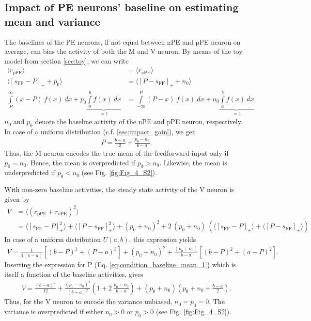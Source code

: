 \documentclass[10pt,a4paper,draft]{article}
\begin{document}
\subsection{Impact of PE neurons' baseline on estimating mean and variance}\label{sec:impact_baseline} 
%
The baselines of the PE neurons, if not equal between nPE and pPE neuron on average, can bias the activity of both the M and V neuron. By means of the toy model from section \ref{sec:toy}, we can write
%
\begin{align}
\label{eq:condition_baseline_mean}
\langle r_\mathrm{pPE} \rangle &= \langle r_\mathrm{nPE} \rangle \\
\langle \left[s_\mathrm{FF} - P\right]_+ + p_0\rangle &= \langle \left[P - s_\mathrm{FF}\right]_+ + n_0\rangle \nonumber\\
\int\limits_P^\infty (x - P)\ f(x)\ dx + p_0 \underbrace{\int\limits_a^b f(x)\ dx}_{=1}  &= \int\limits_{-\infty}^P (P - x)\ f(x)\ dx + n_0 \underbrace{\int\limits_a^b f(x)\ dx}_{=1} . \nonumber
\end{align}
%
$n_0$ and $p_0$ denote the baseline activity of the nPE and pPE neuron, respectively.
In case of a uniform distribution (c.f. \ref{sec:impact_gain}), we get 
%
%
\begin{align}
\label{eq:condition_baseline_mean_1}
P = \frac{b+a}{2} + \frac{p_0 - n_0}{b-a}.
\end{align}
%
Thus, the M neuron encodes the true mean of the feedforward input only if $p_0 = n_0$. Hence, the mean is overpredicted if $p_0 > n_0$. Likewise, the mean is underpredicted if $p_0 < n_0$ (see Fig. \ref{fig:Fig_4_S2}).

With non-zero baseline activities, the steady state activity of the V neuron is given by
%
\begin{align}
\label{eq:condition_baseline_variance}
V &= \langle \left( r_\mathrm{pPE} + r_\mathrm{nPE} \right)^2 \rangle \\
&= \langle \left[ s_\mathrm{FF}-P\right]_+^2\rangle + \langle \left[ P-s_\mathrm{FF}\right]_+^2\rangle + (p_0 + n_0)^2 + 2\ (p_0 + n_0)\ \left( \langle \left[ s_\mathrm{FF}-P\right]_+\rangle + \langle \left[ P-s_\mathrm{FF}\right]_+ \rangle\right) \nonumber
\end{align}
%
In case of a uniform distribution $U(a,b)$, this expression yields
%
\begin{align}
\label{eq:condition_baseline_variance_1}
V = \frac{1}{3\ (b-a)} \left[ (b-P)^3 + (P-a)^3\right] + (p_0 + n_0)^2 + \frac{(p_0 + n_0)}{b-a} \left[ (b-P)^2 + (a-P)^2\right].
\end{align}
%
Inserting the expression for P (Eq. \ref{eq:condition_baseline_mean_1}) which is itself a function of the baseline activities, gives
%
\begin{align}
\label{eq:condition_baseline_variance_2}
V =  \frac{(b-a)^2}{12} + \frac{(p_0-n_0)^2}{(b-a)^2} \left( 1 + 2\ \frac{p_0+n_0}{b-a}\right) + (p_0 + n_0) \left( p_0 + n_0 + \frac{b-a}{2}\right).
\end{align}
%
Thus, for the V neuron to encode the variance unbiased, $n_0 = p_0 = 0$. The variance is overpredicted if either $n_0 > 0$ or $p_0 > 0$ (see Fig. \ref{fig:Fig_4_S2}).
\end{document}
